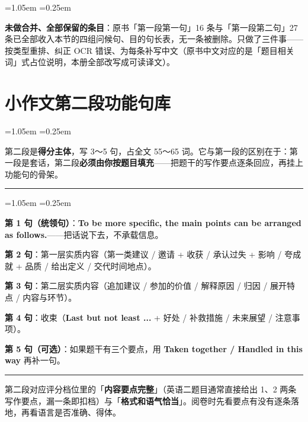 \documentclass[11pt,a4paper]{ctexart}
\newcommand{\kw}[1]{{\bfseries\color{accent}#1}}
\newcommand{\rubric}[1]{\par\addvspace{3pt}\noindent{\bfseries【对标评分】}#1\par\addvspace{3pt}}
\newenvironment{tpl}[1]{%
  \par\addvspace{7pt}\needspace{4\baselineskip}%
  \noindent{\bfseries\color{accent}#1}\par\nopagebreak
  \vspace{2pt}\noindent\rule{\linewidth}{0.7pt}\par\nopagebreak\vspace{3pt}%
  \begin{list}{}{\leftmargin=1.05em \rightmargin=0.25em \listparindent=0pt
    \itemindent=0pt \topsep=0pt \parsep=2.5pt \itemsep=2.5pt \partopsep=0pt}%
  \item\relax
}{%
  \end{list}\vspace{1pt}\noindent\rule{\linewidth}{0.7pt}\par\addvspace{8pt}%
}
\newenvironment{note}{%
  \par\addvspace{5pt}%
  \begin{list}{}{\leftmargin=1.05em \rightmargin=0.25em \listparindent=0pt
    \itemindent=0pt \topsep=0pt \parsep=2pt \itemsep=2pt \partopsep=0pt}%
  \item\relax\small\color{ink}%
}{%
  \end{list}\addvspace{5pt}%
}
\begin{document}
\begin{note}
\textbf{未做合并、全部保留的条目}：原书「第一段第一句」16 条与「第一段第二句」27 条已全部收入本节的四组问候句、目的句长表，无一条被删除。只做了三件事——按类型重排、纠正 OCR 错误、为每条补写中文（原书中文对应的是「题目相关词」式占位说明，本册全部改写成可读译文）。
\end{note}


\section{小作文第二段功能句库}

\begin{note}
第二段是\textbf{得分主体}，写 3～5 句，占全文 55～65 词。它与第一段的区别在于：第一段是套话，第二段\textbf{必须由你按题目填充}——把题干的写作要点逐条回应，再挂上功能句的骨架。
\end{note}

\begin{tpl}{第二段公式}
\textbf{第 1 句（统领句）}：\kw{To be more specific, the main points can be arranged as follows.}——把话说下去，不承载信息。\par
\textbf{第 2 句}：第一层实质内容（第一类建议 / 邀请 + 收获 / 承认过失 + 影响 / 夸成就 + 品质 / 给出定义 / 交代时间地点）。\par
\textbf{第 3 句}：第二层实质内容（追加建议 / 参加的价值 / 解释原因 / 归因 / 展开特点 / 内容与环节）。\par
\textbf{第 4 句}：收束（\kw{Last but not least ...} + 好处 / 补救措施 / 未来展望 / 注意事项）。\par
\textbf{第 5 句（可选）}：如果题干有三个要点，用 \kw{Taken together / Handled in this way} 再补一句。
\end{tpl}

\rubric{第二段对应评分档位里的「\textbf{内容要点完整}」（英语二题目通常直接给出 1、2 两条写作要点，漏一条即扣档）与「\textbf{格式和语气恰当}」。阅卷时先看要点有没有逐条落地，再看语言是否准确、得体。}
\end{document}
